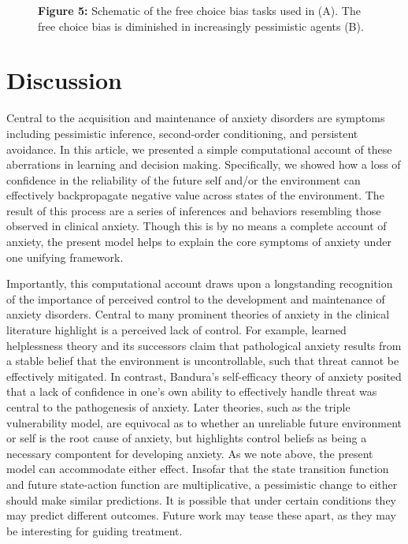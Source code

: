 \documentclass[11pt]{article} %
\begin{document}
\begin{figure}
  \centerline{%
  }
  \par \textbf{Figure 5:} Schematic of the free choice bias tasks used in \cite{Leotti2011, Leotti2014} (A). The free choice bias is diminished in increasingly pessimistic agents (B).
\end{figure}

\section{Discussion}

Central to the acquisition and maintenance of anxiety disorders are symptoms including pessimistic inference, second-order conditioning, and persistent avoidance. In this article, we presented a simple computational account of these aberrations in learning and decision making. Specifically, we showed how a loss of confidence in the reliability of the future self and/or the environment can effectively backpropagate negative value across states of the environment. The result of this process are a series of inferences and behaviors resembling those observed in clinical anxiety. Though this is by no means a complete account of anxiety, the present model helps to explain the core symptoms of anxiety under one unifying framework.

Importantly, this computational account draws upon a longstanding recognition of the importance of perceived control to the development and maintenance of anxiety disorders. Central to many prominent theories of anxiety in the clinical literature highlight is a perceived lack of control. For example, learned helplessness theory and its successors claim that pathological anxiety results from a stable belief that the environment is uncontrollable, such that threat cannot be effectively mitigated. In contrast, Bandura's self-efficacy theory of anxiety posited that a lack of confidence in one's own ability to effectively handle threat was central to the pathogenesis of anxiety. Later theories, such as the triple vulnerability model, are equivocal as to whether an unreliable future environment or self is the root cause of anxiety, but highlights control beliefs as being a necessary compontent for developing anxiety. As we note above, the present model can accommodate either effect. Insofar that the state transition function and future state-action function are multiplicative, a pessimistic change to either should make similar predictions. It is possible that under certain conditions they may predict different outcomes. Future work may tease these apart, as they may be interesting for guiding treatment.
\end{document}
